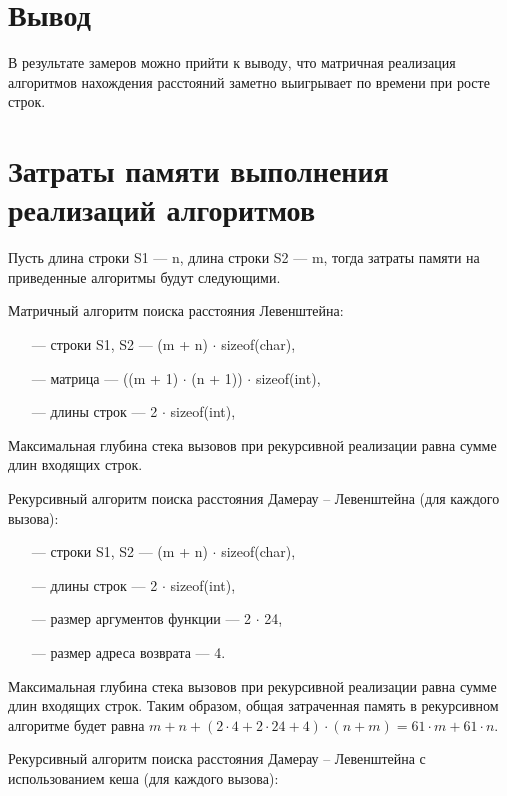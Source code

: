 
\newpage

\section*{Вывод}

В результате замеров можно прийти к выводу, что матричная реализация алгоритмов нахождения расстояний заметно выигрывает по времени при росте строк.

\section{Затраты памяти выполнения реализаций алгоритмов}

Пусть длина строки S1 --- n, длина строки S2 --- m, тогда затраты памяти на приведенные  алгоритмы будут следующими.

Матричный алгоритм поиска расстояния Левенштейна:
\begin{itemize}
    \item[---] строки S1, S2 --- (m + n) $\cdot$ sizeof(char),
    \item[---] матрица --- ((m + 1) $\cdot$ (n + 1)) $\cdot$ sizeof(int),
    \item[---] длины строк --- 2 $\cdot$ sizeof(int),
\end{itemize}

Максимальная глубина стека вызовов при рекурсивной реализации равна сумме длин входящих строк.

Рекурсивный алгоритм поиска расстояния Дамерау -- Левенштейна (для каждого вызова):
\begin{itemize}
    \item[---] строки S1, S2 --- (m + n) $\cdot$ sizeof(char),
    \item[---] длины строк --- 2 $\cdot$ sizeof(int),
    \item[---] размер аргументов функции --- 2 $\cdot$ 24,
    \item[---] размер адреса возврата --- 4.
\end{itemize}

Максимальная глубина стека вызовов при рекурсивной реализации равна сумме длин входящих строк. Таким образом, общая затраченная память в рекурсивном алгоритме будет равна $m + n + (2 \cdot 4 + 2 \cdot 24 + 4) \cdot (n + m) = 61\cdot m + 61\cdot n$.

Рекурсивный алгоритм поиска расстояния Дамерау -- Левенштейна с использованием кеша (для каждого вызова): 

